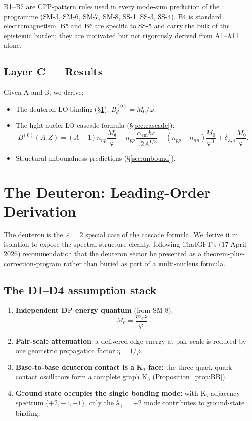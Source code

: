 \documentclass[11pt,letterpaper]{article}
\newcommand{\phig}{\varphi}
\newcommand{\Mzero}{M_0}
\newcommand{\Bdlo}{B_{d}^{(0)}}
\newcommand{\npnp}{n_{np}}
\newcommand{\npp}{n_{pp}}
\newcommand{\nnn}{n_{nn}}
\begin{document}
B1--B3 are CPP-pattern rules used in every mode-sum prediction of the programme (SM-3, SM-6, SM-7, SM-8, SS-1, SS-3, SS-4). B4 is standard electromagnetism. B5 and B6 are specific to SS-5 and carry the bulk of the epistemic burden; they are motivated but not rigorously derived from A1--A11 alone.

\subsection{Layer C --- Results}
\label{sec:LayerC}

Given A and B, we derive:
\begin{itemize}
\item The deuteron LO binding (§\ref{sec:deuteron_LO}): $\Bdlo = \Mzero/\phig$.
\item The light-nuclei LO cascade formula (§\ref{sec:cascade}):
\[
B^{(0)}(A, Z) = (A-1) \npnp \frac{\Mzero}{\phig} - \npp \frac{\alpha_{\mathrm{em}}\hbar c}{1.2 A^{1/3}} - (\npp + \nnn) \frac{\Mzero}{\phig^3} + \delta_{A,4} \frac{\Mzero}{\phig}.
\]
\item Structural unboundness predictions (§\ref{sec:unbound}).
\end{itemize}

\section{The Deuteron: Leading-Order Derivation}
\label{sec:deuteron_LO}

The deuteron is the $A = 2$ special case of the cascade formula. We derive it in isolation to expose the spectral structure cleanly, following ChatGPT's (17 April 2026) recommendation that the deuteron sector be presented as a theorem-plus-correction-program rather than buried as part of a multi-nucleus formula.

\subsection{The D1--D4 assumption stack}

\begin{enumerate}[label=(D\arabic*)]
\item \textbf{Independent DP energy quantum} (from SM-8):
\[
\Mzero = \frac{m_e z}{\phig}.
\]
\item \textbf{Pair-scale attenuation:} a delivered-edge energy at pair scale is reduced by one geometric propagation factor $\eta = 1/\phig$.
\item \textbf{Base-to-base deuteron contact is a K$_3$ face:} the three quark-quark contact oscillators form a complete graph K$_3$ (Proposition~\ref{prop:BB}).
\item \textbf{Ground state occupies the single bonding mode:} with K$_3$ adjacency spectrum $\{+2, -1, -1\}$, only the $\lambda_+ = +2$ mode contributes to ground-state binding.
\end{enumerate}
\end{document}
